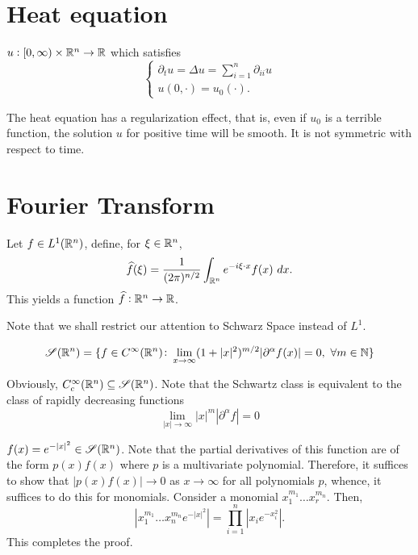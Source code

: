 \section*{Heat equation}

$u: [0,\infty)\times\mathbb{R}^n\to\mathbb{R}$ which satisfies 
\begin{equation*}
    \begin{cases}
        \partial_t u = \Delta u = \sum_{i = 1}^n \partial_{ii}u\\
        u(0,\cdot) = u_0(\cdot).
    \end{cases}
\end{equation*}

The heat equation has a regularization effect, that is, even if $u_0$ is a terrible function, the solution $u$ for positive time will be smooth. It is not symmetric with respect to time. 

\section{Fourier Transform}

\begin{definition}
    Let $f\in L^1(\mathbb{R}^n)$, define, for $\xi\in\mathbb{R}^n$,
    \begin{equation*}
        \widehat{f}(\xi) = \frac{1}{(2\pi)^{n/2}}\int_{\mathbb{R}^n}e^{-i\xi\cdot x}f(x)~dx.
    \end{equation*}
    This yields a function $\widehat{f}:\mathbb{R}^n\to\mathbb{R}$.
\end{definition}

Note that we shall restrict our attention to Schwarz Space instead of $L^1$.

\begin{equation*}
    \mathscr S(\mathbb{R}^n) = \{f\in C^\infty(\mathbb{R}^n)\colon \lim_{x\to\infty}(1 + |x|^2)^{m/2}|\partial^\alpha f(x)| = 0,~\forall m\in\mathbb{N}\}
\end{equation*}

Obviously, $C_c^\infty(\mathbb{R}^n)\subseteq\mathscr S(\mathbb{R}^n)$. Note that the Schwartz class is equivalent to the class of rapidly decreasing functions 
\begin{equation*}
    \lim_{|x|\to\infty}|x|^m|\partial^\alpha f| = 0
\end{equation*}

\begin{example}
    $f(x) = e^{-|x|^2}\in\mathscr S(\mathbb{R}^n)$. Note that the partial derivatives of this function are of the form $p(x)f(x)$ where $p$ is a multivariate polynomial. Therefore, it suffices to show that $|p(x)f(x)|\to 0$ as $x\to\infty$ for all polynomials $p$, whence, it suffices to do this for monomials. Consider a monomial $x_1^{m_1}\dots x_r^{m_n}$. Then, 
    \begin{equation*}
        |x_1^{m_1}\dots x_n^{m_n}e^{-|x|^2}| = \prod_{i = 1}^n |x_ie^{-x_i^2}|.
    \end{equation*}
    This completes the proof.
\end{example}

